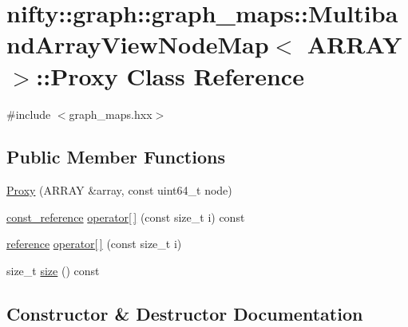 \hypertarget{classnifty_1_1graph_1_1graph__maps_1_1MultibandArrayViewNodeMap_1_1Proxy}{}\section{nifty\+:\+:graph\+:\+:graph\+\_\+maps\+:\+:Multiband\+Array\+View\+Node\+Map$<$ A\+R\+R\+AY $>$\+:\+:Proxy Class Reference}
\label{classnifty_1_1graph_1_1graph__maps_1_1MultibandArrayViewNodeMap_1_1Proxy}


{\ttfamily \#include $<$graph\+\_\+maps.\+hxx$>$}

\subsection*{Public Member Functions}
\begin{DoxyCompactItemize}
\item 
\hyperlink{classnifty_1_1graph_1_1graph__maps_1_1MultibandArrayViewNodeMap_1_1Proxy_af71365cdbc48a7443712589e08b29f92}{Proxy} (A\+R\+R\+AY \&array, const uint64\+\_\+t node)
\item 
\hyperlink{structnifty_1_1graph_1_1graph__maps_1_1MultibandArrayViewNodeMap_a9a4da5d4bb0e9439af359184b91bc65b}{const\+\_\+reference} \hyperlink{classnifty_1_1graph_1_1graph__maps_1_1MultibandArrayViewNodeMap_1_1Proxy_aba2e26cf2ea9f2de9174052060029d25}{operator\mbox{[}$\,$\mbox{]}} (const size\+\_\+t i) const
\item 
\hyperlink{structnifty_1_1graph_1_1graph__maps_1_1MultibandArrayViewNodeMap_ae8a745152ddc0f45748a17dc130403f6}{reference} \hyperlink{classnifty_1_1graph_1_1graph__maps_1_1MultibandArrayViewNodeMap_1_1Proxy_a38bae30fe7f27638ef27fc7dddb2a7da}{operator\mbox{[}$\,$\mbox{]}} (const size\+\_\+t i)
\item 
size\+\_\+t \hyperlink{classnifty_1_1graph_1_1graph__maps_1_1MultibandArrayViewNodeMap_1_1Proxy_ab3cc03e963c331e47951424034304dc2}{size} () const
\end{DoxyCompactItemize}


\subsection{Constructor \& Destructor Documentation}
\mbox{\label{classnifty_1_1graph_1_1graph__maps_1_1MultibandArrayViewNodeMap_1_1Proxy_af71365cdbc48a7443712589e08b29f92}} 
